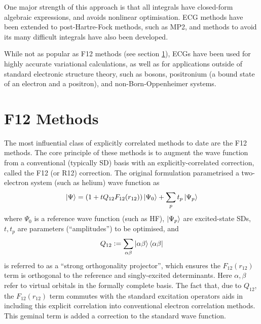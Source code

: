 One major strength of this approach is that all integrals have closed-form algebraic expressions,\cite{lesterGaussian1964} and avoids nonlinear optimisation.\cite{bukowskiNew1994,perssonAccurate1996} \Gls{ECG} methods have been extended to post-Hartre-Fock methods, such as MP2\cite{panGaussian1970,panElectron1972}, and methods to avoid its many difficult integrals have also been developed.\cite{szalewiczNew1982,szalewiczAtomic1983,wenzelAtomic1986,szalewiczAtomic1984,tewWeak2007}

While not as popular as F12 methods (see section \ref{sec:f12}), \glspl{ECG} have been used for highly accurate variational calculations,\cite{korobovCoulomb2000} as well as for applications outside of standard electronic structure theory, such as bosons,\cite{vargaPrecise1995} positronium (a bound state of an electron and a positron),\cite{bubinGroundstate2011} and non-Born-Oppenheimer systems.\cite{stankeNonBornOppenheimer2009}

\section{F12 Methods}
\label{sec:f12}

The most influential class of explicitly correlated methods to date are the F12 methods. The core principle of these methods is to augment the wave function from a conventional (typically \gls{SD}) basis with an explicitly-correlated correction, called the F12 (or R12) correction. The original formulation\supercite{kutzelnigg12Dependent1985} parametrised a two-electron system (such as helium) wave function as
\begin{equation}
    \label{eq:first-r12}
    \ket\Psi = (1+tQ_{12}F_{12}(r_{12}))\ket{\Psi_0}+\sum_{p}t_{p}\ket{\Psi_{p}}
\end{equation}
where $\Psi_0$ is a reference wave function (such as \gls{HF}), $\ket{\Psi_{p}}$ are excited-state \glspl{SD}, $t,t_{p}$ are parameters (``amplitudes'') to be optimised, and
\begin{equation}
    Q_{12} \mathrel{\mathop:}= \sum_{\alpha\beta}\ket{\alpha\beta}\bra{\alpha\beta}
\end{equation}
is referred to as a ``strong orthogonality projector'', which ensures the $F_{12}(r_{12})$ term is orthogonal to the reference and singly-excited determinants.
Here $\alpha,\beta$ refer to virtual orbitals in the formally complete basis. The fact that, due to $Q_{12}$, the $F_{12}(r_{12})$ term commutes with the standard excitation operators aids in including this explicit correlation into conventional electron correlation methods. This geminal term is added a correction to the standard wave function.

